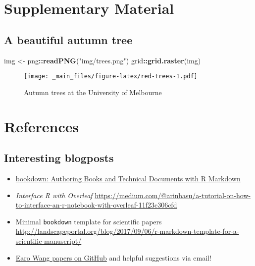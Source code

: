 \documentclass[12pt,]{article}
\newenvironment{Shaded}{\begin{snugshade}}{\end{snugshade}}
\newcommand{\KeywordTok}[1]{\textcolor[rgb]{0.13,0.29,0.53}{\textbf{#1}}}
\newcommand{\StringTok}[1]{\textcolor[rgb]{0.31,0.60,0.02}{#1}}
\newcommand{\OperatorTok}[1]{\textcolor[rgb]{0.81,0.36,0.00}{\textbf{#1}}}
\newcommand{\NormalTok}[1]{#1}
\newcommand{\beginsupplement}{\setcounter{table}{0}  \renewcommand{\thetable}{S\arabic{table}} \setcounter{figure}{0} \renewcommand{\thefigure}{S\arabic{figure}}}
\begin{document}
\section*{Supplementary Material}\label{supplementary-material}

\beginsupplement

\subsection*{A beautiful autumn tree}\label{a-beautiful-autumn-tree}

\begin{Shaded}
\begin{Highlighting}[]
\NormalTok{img <-}\StringTok{ }\NormalTok{png}\OperatorTok{::}\KeywordTok{readPNG}\NormalTok{(}\StringTok{"img/trees.png"}\NormalTok{)}
\NormalTok{grid}\OperatorTok{::}\KeywordTok{grid.raster}\NormalTok{(img)}
\end{Highlighting}
\end{Shaded}

\begin{figure}
\centering
\texttt{[image: \_main\_files/figure-latex/red-trees-1.pdf]}
\caption{\label{fig:red-trees}Autumn trees at the University of Melbourne}
\end{figure}

\newpage

\section*{References}\label{references}

\subsection{Interesting blogposts}\label{interesting-blogposts}

\begin{itemize}
\item
  \href{https://bookdown.org/yihui/bookdown/}{bookdown: Authoring Books
  and Technical Documents with R Markdown}
\item
  \emph{Interface R with Overleaf}
  \url{https://medium.com/@arinbasu/a-tutorial-on-how-to-interface-an-r-notebook-with-overleaf-11f23c306cfd}
\item
  Minimal \texttt{bookdown} template for scientific papers
  \url{http://landscapeportal.org/blog/2017/09/06/r-markdown-template-for-a-scientific-manuscript/}
\item
  \href{https://github.com/earowang/paper-calendar-vis}{Earo Wang papers
  on GitHub} and helpful suggestions via email!
\end{itemize}
\end{document}
